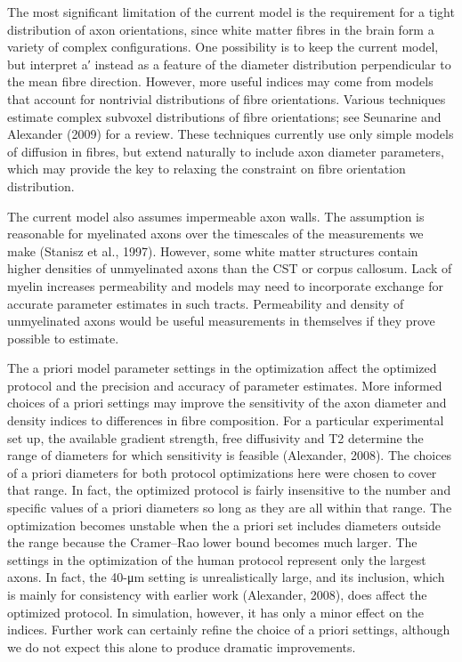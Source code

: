 The most significant limitation of the current model is the requirement for a tight distribution of axon orientations, since white matter fibres in the brain form a variety of complex configurations. One possibility is to keep the current model, but interpret a′ instead as a feature of the diameter distribution perpendicular to the mean fibre direction. However, more useful indices may come from models that account for nontrivial distributions of fibre orientations. Various techniques estimate complex subvoxel distributions of fibre orientations; see Seunarine and Alexander (2009) for a review. These techniques currently use only simple models of diffusion in fibres, but extend naturally to include axon diameter parameters, which may provide the key to relaxing the constraint on fibre orientation distribution.

The current model also assumes impermeable axon walls. The assumption is reasonable for myelinated axons over the timescales of the measurements we make (Stanisz et al., 1997). However, some white matter structures contain higher densities of unmyelinated axons than the CST or corpus callosum. Lack of myelin increases permeability and models may need to incorporate exchange for accurate parameter estimates in such tracts. Permeability and density of unmyelinated axons would be useful measurements in themselves if they prove possible to estimate.


The a priori model parameter settings in the optimization affect the optimized protocol and the precision and accuracy of parameter estimates. More informed choices of a priori settings may improve the sensitivity of the axon diameter and density indices to differences in fibre composition. For a particular experimental set up, the available gradient strength, free diffusivity and T2 determine the range of diameters for which sensitivity is feasible (Alexander, 2008). The choices of a priori diameters for both protocol optimizations here were chosen to cover that range. In fact, the optimized protocol is fairly insensitive to the number and specific values of a priori diameters so long as they are all within that range. The optimization becomes unstable when the a priori set includes diameters outside the range because the Cramer–Rao lower bound becomes much larger. The settings in the optimization of the human protocol represent only the largest axons. In fact, the 40-μm setting is unrealistically large, and its inclusion, which is mainly for consistency with earlier work (Alexander, 2008), does affect the optimized protocol. In simulation, however, it has only a minor effect on the indices. Further work can certainly refine the choice of a priori settings, although we do not expect this alone to produce dramatic improvements.


